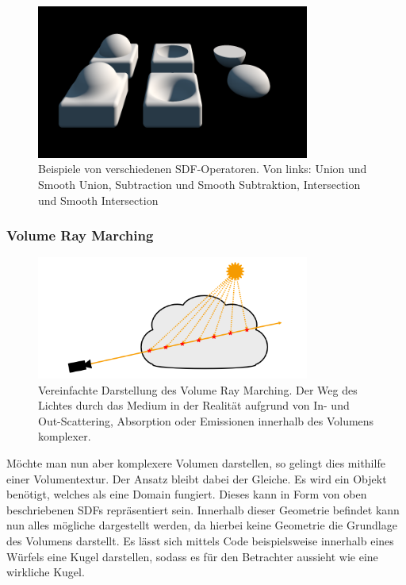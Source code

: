 \begin{figure}[h]
	\centering
	\includegraphics[width=0.80\textwidth]{Grafiken/Basics/Volume/sdfOperators.png}
	\begin{footnotesize}
		\caption{Beispiele von verschiedenen SDF-Operatoren.
			Von links: Union und Smooth Union, Subtraction und Smooth Subtraktion, Intersection und Smooth Intersection}
		\label{fig:sdfOperators}
	\end{footnotesize}
\end{figure}




\subsubsection{Volume Ray Marching}

\begin{figure}[hb]
	\centering
	\includegraphics[width=0.80\textwidth]{Grafiken/Basics/Volume/Volume_RayMarching.png}
	\begin{footnotesize}
		\caption{Vereinfachte Darstellung des Volume Ray Marching. Der Weg des Lichtes durch
			das Medium in der Realität aufgrund von In- und Out-Scattering, Absorption oder Emissionen innerhalb des
			Volumens komplexer.}
		\label{fig:volumeRayMarching}
	\end{footnotesize}
\end{figure}


Möchte man nun aber komplexere Volumen darstellen, so gelingt dies mithilfe einer Volumentextur. Der Ansatz bleibt dabei der Gleiche.
Es wird ein Objekt benötigt, welches als eine Domain fungiert. Dieses kann in Form von oben beschriebenen SDFs repräsentiert sein.
Innerhalb dieser Geometrie befindet kann nun alles mögliche dargestellt werden, da hierbei keine Geometrie die Grundlage des
Volumens darstellt. Es lässt sich mittels Code beispielsweise innerhalb eines Würfels eine Kugel darstellen,
sodass es für den Betrachter aussieht wie eine wirkliche Kugel.


